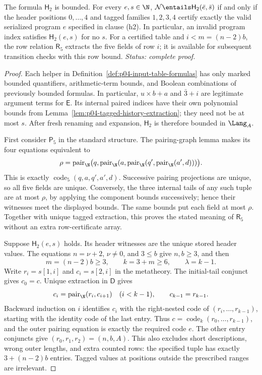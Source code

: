 \begin{lemma}
\label{lem:p04-table-formula}
The formula \(\mathsf H_2\) is bounded.  For every \(e,s\in\N\),
\(\mathcal N\entails\mathsf H_2(\bar e,\bar s)\) if and only if
the header positions \(0,\ldots,4\) and tagged families
\(1,2,3,4\) certify exactly the valid serialized program \(e\)
specified in clause (h2).  In particular, an invalid program index
satisfies \(\mathsf H_2(e,s)\) for no \(s\).  For a certified
table and \(i<m=(n-2)b\), the row relation \(\mathsf R_5\)
extracts the five fields of row \(i\); it is available for subsequent
transition checks with this row bound.
\textit{Status: complete proof.}
\end{lemma}

\begin{proof}
Each helper in Definition~\ref{def:p04-input-table-formulas} has
only marked bounded quantifiers, arithmetic-term bounds, and Boolean
combinations of previously bounded formulas.  In particular,
\(u\times b+a\) and \(\bar3+i\) are legitimate argument terms
for \(\mathsf E\).  Its internal paired indices have their own
polynomial bounds from Lemma~\ref{lem:p04-tagged-history-extraction};
they need not be at most \(s\).  After fresh renaming and expansion,
\(\mathsf H_2\) is therefore bounded in \(\Lang_A\).

First consider \(\mathsf P_5\) in the standard structure.
The pairing-graph lemma makes its four equations equivalent to
\[
 \rho=\operatorname{pair}_{\N}
  \bigl(q,\operatorname{pair}_{\N}
   (a,\operatorname{pair}_{\N}
    (q',\operatorname{pair}_{\N}(a',d)))\bigr).
\]
This is exactly \(\operatorname{code}_5(q,a,q',a',d)\).
Successive pairing projections are unique, so all five fields are
unique.  Conversely, the three internal tails of any such tuple are
at most \(\rho\), by applying the component bounds successively;
hence their witnesses meet the displayed bounds.  The same bounds
put each field at most \(\rho\).  Together with unique tagged
extraction, this proves the stated meaning of \(\mathsf R_5\)
without an extra row-certificate array.

Suppose \(\mathsf H_2(e,s)\) holds.  Its header witnesses are the
unique stored header values.  The equations
\(n=\nu+2\), \(\nu\ne0\), and \(3\leq b\) give
\(n,b\geq3\), and then
\[
 m=(n-2)b\geq3,\qquad k=3+m\geq6,\qquad \lambda=k-1.
\]
Write \(r_i=s[1,i]\) and \(c_i=s[2,i]\) in the metatheory.
The initial-tail conjunct gives \(c_0=c\).  Unique extraction in
\(\mathsf D\) gives
\[
 c_i=\operatorname{pair}_{\N}(r_i,c_{i+1})\quad(i<k-1),
 \qquad c_{k-1}=r_{k-1}.
\]
Backward induction on \(i\) identifies \(c_i\) with the
right-nested code of \((r_i,\ldots,r_{k-1})\), starting with the
identity code of the last entry.  Thus
\(c=\operatorname{code}_k(r_0,\ldots,r_{k-1})\), and the outer
pairing equation is exactly the required code \(e\).  The other
entry conjuncts give \((r_0,r_1,r_2)=(n,b,A)\).  This also excludes
short descriptions, wrong outer lengths, and extra counted rows:
the specified tuple has exactly \(3+(n-2)b\) entries.  Tagged values
at positions outside the prescribed ranges are irrelevant.


\end{proof}
